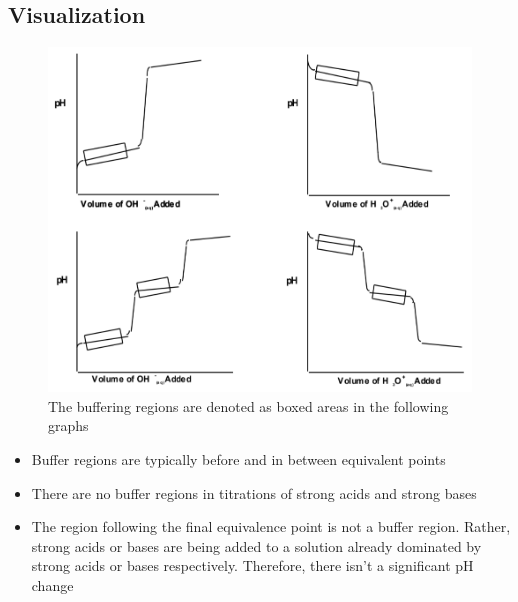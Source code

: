 \documentclass[a4paper,12pt]{article}
\begin{document}
\subsection{Visualization}
\begin{figure}[H]
    \centering
    \caption{The buffering regions are denoted as boxed areas in the following graphs}
    \includegraphics[width=\textwidth]{buffers}
\end{figure}
\begin{itemize}
    \item{Buffer regions are typically before and in between equivalent points}
    \item{There are no buffer regions in titrations of strong acids and strong bases}
    \item{The region following the final equivalence point is not a buffer region. Rather, strong acids or bases are being added to a solution already dominated by strong acids or bases respectively. Therefore, there isn't a significant pH change}
\end{itemize}
\end{document}
